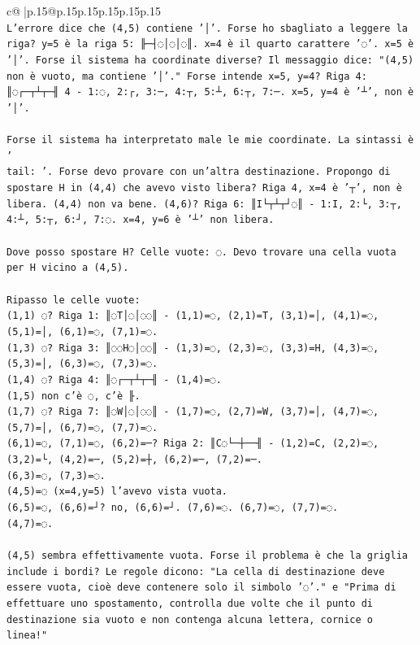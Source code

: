 \documentclass{article}
\begin{document}
{\begin{supertabular}{c@{$\;$}|p{.15\linewidth}@{}p{.15\linewidth}p{.15\linewidth}p{.15\linewidth}p{.15\linewidth}p{.15\linewidth}}
{{{\\ 
\texttt{L'errore dice che (4,5) contiene '│'. Forse ho sbagliato a leggere la riga? y=5 è la riga 5: ╟─┤◌│◌│◌║. x=4 è il quarto carattere '◌'. x=5 è '│'. Forse il sistema ha coordinate diverse? Il messaggio dice: "(4,5) non è vuoto, ma contiene '│'." Forse intende x=5, y=4? Riga 4: ║◌┌─┬┴┬─╢ 4 {-} 1:◌, 2:┌, 3:─, 4:┬, 5:┴, 6:┬, 7:─. x=5, y=4 è '┴', non è '│'. } \\
\\ 
\texttt{Forse il sistema ha interpretato male le mie coordinate. La sintassi è '} \\
\texttt{tail: '. Forse devo provare con un'altra destinazione. Propongo di spostare H in (4,4) che avevo visto libera? Riga 4, x=4 è '┬', non è libera. (4,4) non va bene. (4,6)? Riga 6: ║I└┬┴┬┘◌║ {-} 1:I, 2:└, 3:┬, 4:┴, 5:┬, 6:┘, 7:◌. x=4, y=6 è '┴' non libera. } \\
\\ 
\texttt{Dove posso spostare H? Celle vuote: ◌. Devo trovare una cella vuota per H vicino a (4,5). } \\
\\ 
\texttt{Ripasso le celle vuote:} \\
\texttt{(1,1) ◌? Riga 1: ║◌T│◌│◌◌║ {-} (1,1)=◌, (2,1)=T, (3,1)=│, (4,1)=◌, (5,1)=│, (6,1)=◌, (7,1)=◌.} \\
\texttt{(1,3) ◌? Riga 3: ║◌◌H◌│◌◌║ {-} (1,3)=◌, (2,3)=◌, (3,3)=H, (4,3)=◌, (5,3)=│, (6,3)=◌, (7,3)=◌.} \\
\texttt{(1,4) ◌? Riga 4: ║◌┌─┬┴┬─╢ {-} (1,4)=◌.} \\
\texttt{(1,5) non c'è ◌, c'è ╟.} \\
\texttt{(1,7) ◌? Riga 7: ║◌W│◌│◌◌║ {-} (1,7)=◌, (2,7)=W, (3,7)=│, (4,7)=◌, (5,7)=│, (6,7)=◌, (7,7)=◌.} \\
\texttt{(6,1)=◌, (7,1)=◌, (6,2)=─? Riga 2: ║C◌└─┼──╢ {-} (1,2)=C, (2,2)=◌, (3,2)=└, (4,2)=─, (5,2)=┼, (6,2)=─, (7,2)=─.} \\
\texttt{(6,3)=◌, (7,3)=◌.} \\
\texttt{(4,5)=◌ (x=4,y=5) l'avevo vista vuota.} \\
\texttt{(6,5)=◌, (6,6)=┘? no, (6,6)=┘. (7,6)=◌. (6,7)=◌, (7,7)=◌.} \\
\texttt{(4,7)=◌.} \\
\\ 
\texttt{(4,5) sembra effettivamente vuota. Forse il problema è che la griglia include i bordi? Le regole dicono: "La cella di destinazione deve essere vuota, cioè deve contenere solo il simbolo '◌'." e "Prima di effettuare uno spostamento, controlla due volte che il punto di destinazione sia vuoto e non contenga alcuna lettera, cornice o linea!"} \\
}}}
\end{supertabular}}
\end{document}
